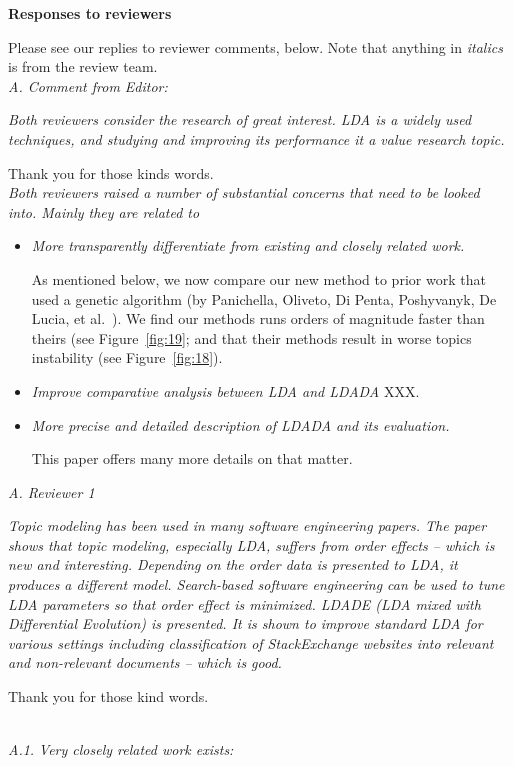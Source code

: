 \documentclass[conference]{IEEEtran}
\newcommand{\fig}[1]{Figure~\ref{fig:#1}}
\newcommand{\bi}{\begin{itemize}}
\newcommand{\ei}{\end{itemize}}
\begin{document}
\pagestyle{plain}
\noindent
\textbf{Responses to reviewers\\}

Please see our replies to reviewer comments, below. Note that anything in {\em italics} is from the review team.\\

\noindent
\textit{A. Comment from Editor:}

{\em Both reviewers consider the research of great interest. LDA is a widely used techniques, and studying and improving its performance it a value research topic.}

Thank you for those kinds words.\\

{\em Both reviewers raised a number of substantial concerns that need to be looked into. Mainly they are related to}

\bi
\item
{\em More transparently differentiate from existing and closely related work.}

As mentioned below, we now compare our new method to prior work
that used a genetic algorithm
(by Panichella, Oliveto,  Di Penta,  Poshyvanyk, De Lucia, et al.~\cite{panichella2013effectively}). We find our methods runs
orders of magnitude faster than theirs (see \fig{19}; and
that their methods result in worse topics instability  (see \fig{18}).
\item
{\em Improve comparative analysis between LDA and LDADA} XXX.
\item
{\em More precise and detailed description of LDADA and its evaluation.} 

This paper offers many more details
on that matter.
\ei

\noindent
\textit{A. Reviewer 1}

\textit{Topic modeling has been used in many software engineering papers. The paper shows that topic modeling, especially LDA, suffers from order effects -- which is new and interesting. Depending on the order data is presented to LDA, it produces a different model. Search-based software engineering can be used to tune LDA parameters so that order effect is minimized. LDADE (LDA mixed with Differential Evolution) is presented. It is shown to improve standard LDA for various settings including classification of StackExchange websites into relevant and non-relevant documents -- which is good.}

Thank you for those kind words.

\noindent
\textit{\\A.1.}
\textit{Very closely related work exists:}
\end{document}
